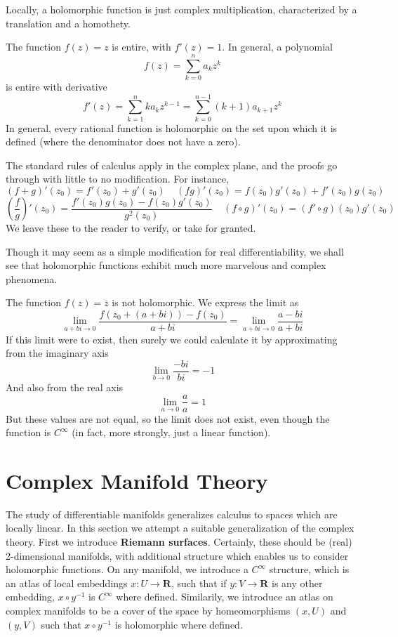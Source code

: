 Locally, a holomorphic function is just complex multiplication, characterized by a translation and a homothety.

\begin{example}
    The function $f(z) = z$ is entire, with $f'(z) = 1$. In general, a polynomial
    \[ f(z) = \sum_{k = 0}^n a_k z^k \]
    is entire with derivative
    \[ f'(z) = \sum_{k = 1}^n k a_k z^{k-1} = \sum_{k = 0}^{n-1} (k + 1) a_{k+1} z^k \]
    In general, every rational function is holomorphic on the set upon which it is defined (where the denominator does not have a zero).
\end{example}

The standard rules of calculus apply in the complex plane, and the proofs go through with little to no modification. For instance,
%
\[ (f + g)'(z_0) = f'(z_0) + g'(z_0)\ \ \ \ \ (fg)'(z_0) = f(z_0)g'(z_0) + f'(z_0)g(z_0) \]
%
\[ \left(\frac{f}{g}\right)'(z_0) = \frac{f'(z_0)g(z_0) - f(z_0)g'(z_0)}{g^2(z_0)}\ \ \ \ \ (f \circ g)'(z_0) = (f' \circ g)(z_0) g'(z_0) \]
%
We leave these to the reader to verify, or take for granted.

Though it may seem as a simple modification for real differentiability, we shall see that holomorphic functions exhibit much more marvelous and complex phenomena.

\begin{example}
    The function $f(z) = \overline{z}$ is not holomorphic. We express the limit as
    \[ \lim_{a + bi \to 0} \frac{f(z_0 + (a + bi)) - f(z_0)}{a + bi} = \lim_{a + bi \to 0} \frac{a - bi}{a + bi} \]
    If this limit were to exist, then surely we could calculate it by approximating from the imaginary axis
    \[ \lim_{b \to 0} \frac{-bi}{bi} = -1 \]
    And also from the real axis
    \[ \lim_{a \to 0} \frac{a}{a} = 1 \]
    But these values are not equal, so the limit does not exist, even though the function is $C^\infty$ (in fact, more strongly, just a linear function).
\end{example}



\section{Complex Manifold Theory}

The study of differentiable manifolds generalizes calculus to spaces which are locally linear. In this section we attempt a suitable generalization of the complex theory. First we introduce {\bf Riemann surfaces}. Certainly, these should be (real) 2-dimensional manifolds, with additional structure which enables us to consider holomorphic functions. On any manifold, we introduce a $C^\infty$ structure, which is an atlas of local embeddings $x:U \to \mathbf{R}$, such that if $y: V \to \mathbf{R}$ is any other embedding, $x \circ y^{-1}$ is $C^\infty$ where defined. Similarily, we introduce an atlas on complex manifolds to be a cover of the space by homeomorphisms $(x,U)$ and $(y,V)$ such that $x \circ y^{-1}$ is holomorphic where defined.

